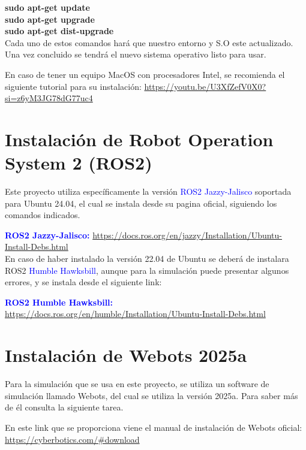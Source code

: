 \documentclass[letter,11pt]{article} %
\begin{document}
\begin{enumerate}
		\textbf{sudo apt-get update}\\
		
		\textbf{sudo apt-get upgrade}\\
		
		\textbf{sudo apt-get dist-upgrade}\\
		
		Cada uno de estos comandos hará que nuestro entorno y S.O este actualizado. Una vez concluido se tendrá el nuevo sistema operativo listo para usar.
		
		En caso de tener un equipo MacOS con procesadores Intel, se recomienda el siguiente tutorial para su instalación: \url{https://youtu.be/U3XfZefV0X0?si=z6yM3JG78dG77uc4}
		
	\section{Instalación de Robot Operation System 2 (ROS2)}
	
	Este proyecto utiliza específicamente la versión \textcolor{blue}{ROS2 Jazzy-Jalisco} soportada para Ubuntu 24.04, el cual se instala desde su pagina oficial, siguiendo los comandos indicados.
	
	\textcolor{blue}{\textbf{ROS2 Jazzy-Jalisco: } }\url{https://docs.ros.org/en/jazzy/Installation/Ubuntu-Install-Debs.html}\\
	
	En caso de haber instalado la versión 22.04 de Ubuntu se deberá de instalara ROS2 \textcolor{blue}{Humble Hawksbill}, aunque para la simulación puede presentar algunos errores, y se instala desde el siguiente link:
	
	\textcolor{blue}{\textbf{ROS2 Humble Hawksbill:}} \url{https://docs.ros.org/en/humble/Installation/Ubuntu-Install-Debs.html}\\
	
	\section{Instalación de Webots 2025a}
	
	Para la simulación que se usa en este proyecto, se utiliza un software de simulación llamado Webots, del cual se utiliza la versión 2025a. Para saber más de él consulta la siguiente tarea.
	
	En este link que se proporciona viene el manual de instalación de Webots oficial:
	\url{https://cyberbotics.com/#download}
		
	\end{enumerate}
	
	
	\vspace{0.4cm}
	
\end{document}
